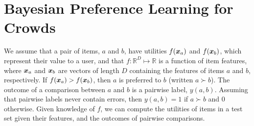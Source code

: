 \section{Bayesian Preference Learning for Crowds}\label{sec:model}

We assume that a pair of items, $a$ and $b$, have utilities
$f(\boldsymbol x_a)$ and $f(\boldsymbol x_b)$, which represent their value to a user,
and that $f: \mathbb{R}^D \mapsto \mathbb{R}$ 
is a function of item features, where $\boldsymbol x_a$ and $\boldsymbol x_b$ are vectors 
of length $D$ containing the features of items $a$ and $b$, respectively.
If $f(\boldsymbol x_a) > f(\boldsymbol x_b)$, then $a$ is preferred to $b$ (written $a \succ b$).
The outcome of a comparison between $a$ and $b$ is 
a pairwise label, $y(a, b)$.
Assuming that pairwise labels never contain errors,
then $y(a, b)=1$ if $a \succ b$ and $0$ otherwise.
Given knowledge of $f$, we can compute the utilities 
of items in a test set given their features, and the outcomes of pairwise comparisons.


